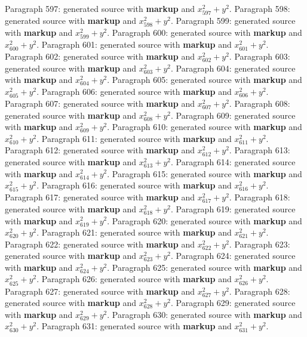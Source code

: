 \documentclass{article}
\begin{document}
Paragraph 597: generated source with \textbf{markup} and $x_{597}^2 + y^2$.
Paragraph 598: generated source with \textbf{markup} and $x_{598}^2 + y^2$.
Paragraph 599: generated source with \textbf{markup} and $x_{599}^2 + y^2$.
Paragraph 600: generated source with \textbf{markup} and $x_{600}^2 + y^2$.
Paragraph 601: generated source with \textbf{markup} and $x_{601}^2 + y^2$.
Paragraph 602: generated source with \textbf{markup} and $x_{602}^2 + y^2$.
Paragraph 603: generated source with \textbf{markup} and $x_{603}^2 + y^2$.
Paragraph 604: generated source with \textbf{markup} and $x_{604}^2 + y^2$.
Paragraph 605: generated source with \textbf{markup} and $x_{605}^2 + y^2$.
Paragraph 606: generated source with \textbf{markup} and $x_{606}^2 + y^2$.
Paragraph 607: generated source with \textbf{markup} and $x_{607}^2 + y^2$.
Paragraph 608: generated source with \textbf{markup} and $x_{608}^2 + y^2$.
Paragraph 609: generated source with \textbf{markup} and $x_{609}^2 + y^2$.
Paragraph 610: generated source with \textbf{markup} and $x_{610}^2 + y^2$.
Paragraph 611: generated source with \textbf{markup} and $x_{611}^2 + y^2$.
Paragraph 612: generated source with \textbf{markup} and $x_{612}^2 + y^2$.
Paragraph 613: generated source with \textbf{markup} and $x_{613}^2 + y^2$.
Paragraph 614: generated source with \textbf{markup} and $x_{614}^2 + y^2$.
Paragraph 615: generated source with \textbf{markup} and $x_{615}^2 + y^2$.
Paragraph 616: generated source with \textbf{markup} and $x_{616}^2 + y^2$.
Paragraph 617: generated source with \textbf{markup} and $x_{617}^2 + y^2$.
Paragraph 618: generated source with \textbf{markup} and $x_{618}^2 + y^2$.
Paragraph 619: generated source with \textbf{markup} and $x_{619}^2 + y^2$.
Paragraph 620: generated source with \textbf{markup} and $x_{620}^2 + y^2$.
Paragraph 621: generated source with \textbf{markup} and $x_{621}^2 + y^2$.
Paragraph 622: generated source with \textbf{markup} and $x_{622}^2 + y^2$.
Paragraph 623: generated source with \textbf{markup} and $x_{623}^2 + y^2$.
Paragraph 624: generated source with \textbf{markup} and $x_{624}^2 + y^2$.
Paragraph 625: generated source with \textbf{markup} and $x_{625}^2 + y^2$.
Paragraph 626: generated source with \textbf{markup} and $x_{626}^2 + y^2$.
Paragraph 627: generated source with \textbf{markup} and $x_{627}^2 + y^2$.
Paragraph 628: generated source with \textbf{markup} and $x_{628}^2 + y^2$.
Paragraph 629: generated source with \textbf{markup} and $x_{629}^2 + y^2$.
Paragraph 630: generated source with \textbf{markup} and $x_{630}^2 + y^2$.
Paragraph 631: generated source with \textbf{markup} and $x_{631}^2 + y^2$.
\end{document}
